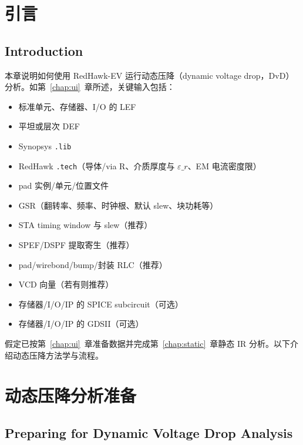 ﻿%
\label{chap:dvd}

\section{引言}
\subsection*{Introduction}

本章说明如何使用 RedHawk-EV 运行动态压降（dynamic voltage drop，DvD）分析。如第~\ref{chap:ui}~章所述，关键输入包括：
\begin{itemize}
  \item 标准单元、存储器、I/O 的 LEF
  \item 平坦或层次 DEF
  \item Synopsys \texttt{.lib}
  \item RedHawk \texttt{.tech}（导体/via R、介质厚度与 $\varepsilon\_r$、EM 电流密度限）
  \item pad 实例/单元/位置文件
  \item GSR（翻转率、频率、时钟根、默认 slew、块功耗等）
  \item STA timing window 与 slew（推荐）
  \item SPEF/DSPF 提取寄生（推荐）
  \item pad/wirebond/bump/封装 RLC（推荐）
  \item VCD 向量（若有则推荐）
  \item 存储器/I/O/IP 的 SPICE subcircuit（可选）
  \item 存储器/I/O/IP 的 GDSII（可选）
\end{itemize}

假定已按第~\ref{chap:ui}~章准备数据并完成第~\ref{chap:static}~章静态 IR 分析。以下介绍动态压降方法学与流程。

\section{动态压降分析准备}
\subsection*{Preparing for Dynamic Voltage Drop Analysis}

